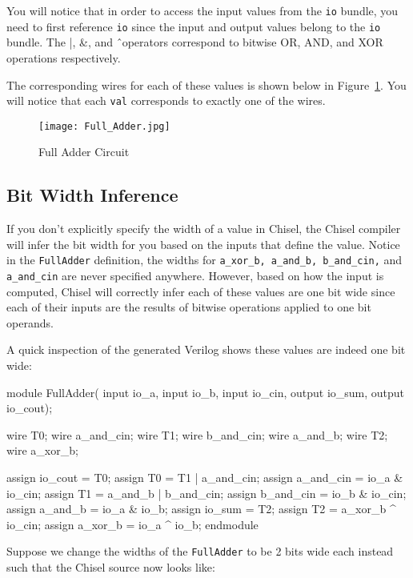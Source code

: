 You will notice that in order to access the input values from the \verb+io+ bundle, you need to first reference \verb+io+ since the input and output values belong to the \verb+io+ bundle. The |, \&, and \^\ operators correspond to bitwise OR, AND, and XOR operations respectively.

The corresponding wires for each of these values is shown below in Figure~\ref{fig:full-adder}.  You will notice that each \verb+val+ corresponds to exactly one of the wires.

\begin{figure}[ht!]
\centering
\texttt{[image: Full\_Adder.jpg]}
\caption{Full Adder Circuit}
\label{fig:full-adder}
\end{figure}


\subsection{Bit Width Inference}

If you don't explicitly specify the width of a value in Chisel, the Chisel compiler will infer the bit width for you based on the inputs that define the value. Notice in the \verb+FullAdder+ definition, the widths for \verb+a_xor_b, a_and_b, b_and_cin,+ and \verb+a_and_cin+ are never specified anywhere. However, based on how the input is computed, Chisel will correctly infer each of these values are one bit wide since each of their inputs are the results of bitwise operations applied to one bit operands.

A quick inspection of the generated Verilog shows these values are indeed one bit wide:

\begin{bash}
module FullAdder(
    input  io_a,
    input  io_b,
    input  io_cin,
    output io_sum,
    output io_cout);

  wire T0;
  wire a_and_cin;
  wire T1;
  wire b_and_cin;
  wire a_and_b;
  wire T2;
  wire a_xor_b;

  assign io_cout = T0;
  assign T0 = T1 | a_and_cin;
  assign a_and_cin = io_a & io_cin;
  assign T1 = a_and_b | b_and_cin;
  assign b_and_cin = io_b & io_cin;
  assign a_and_b = io_a & io_b;
  assign io_sum = T2;
  assign T2 = a_xor_b ^ io_cin;
  assign a_xor_b = io_a ^ io_b;
endmodule
\end{bash}

Suppose we change the widths of the \verb+FullAdder+ to be 2 bits wide each instead such that the Chisel source now looks like:

